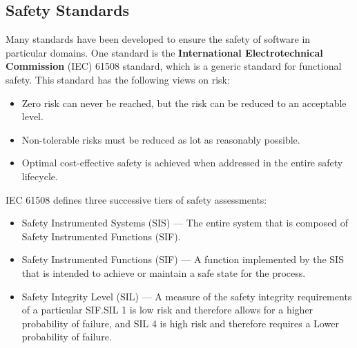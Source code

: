 \documentclass{article}
\begin{document}
\subsection{Safety Standards}
Many standards have been developed to ensure the safety of software in
particular domains. One standard is the \textbf{International
Electrotechnical Commission} (IEC) 61508 standard, which is a generic
standard for functional safety. This standard has the following views
on risk:
\begin{itemize}
    \item Zero risk can never be reached, but the risk can be reduced
          to an acceptable level.
    \item Non-tolerable risks must be reduced as lot as reasonably
          possible.
    \item Optimal cost-effective safety is achieved when addressed in
          the entire safety lifecycle.
\end{itemize}
IEC 61508 defines three successive tiers of safety assessments:
\begin{itemize}
    \item Safety Instrumented Systems (SIS) --- The entire system that
          is composed of Safety Instrumented Functions (SIF).
    \item Safety Instrumented Functions (SIF) --- A function
          implemented by the SIS that is intended to achieve or
          maintain a safe state for the process.
    \item Safety Integrity Level (SIL) --- A measure of the safety
          integrity requirements of a particular SIF.\@ SIL 1 is low
          risk and therefore allows for a higher probability of
          failure, and SIL 4 is high risk and therefore requires a
          Lower probability of failure.
\end{itemize}
\end{document}
